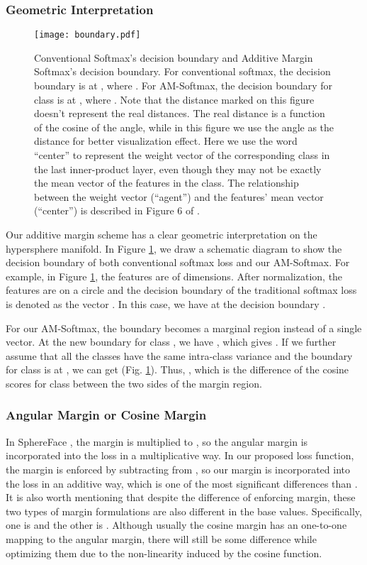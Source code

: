 \documentclass[10pt,twocolumn,letterpaper]{article}
\begin{document}
\subsubsection{Geometric Interpretation}
\begin{figure}
	\centering
	\texttt{[image: boundary.pdf]}
	\caption{ Conventional Softmax's decision boundary and Additive Margin Softmax's decision boundary. For conventional softmax, the decision boundary is at , where . For AM-Softmax, the decision boundary for class  is at , where . Note that the distance marked on this figure doesn't represent the real distances. The real distance is a function of the cosine of the angle, while in this figure we use the angle as the distance for better visualization effect. Here we use the word ``center'' to represent the weight vector of the corresponding class in the last inner-product layer, even though they may not be exactly the mean vector of the features in the class. The relationship between the weight vector (``agent'') and the features' mean vector (``center'') is described in Figure 6 of \cite{wang2017normface}.
	}
	\label{fig:boundary}
\end{figure}
Our additive margin scheme has a clear geometric interpretation on the hypersphere manifold. In Figure \ref{fig:boundary}, we draw a schematic diagram to show the decision boundary of both conventional softmax loss and our AM-Softmax. For example, in Figure \ref{fig:boundary}, the features are of  dimensions. After normalization, the features are on a circle and the decision boundary of the traditional softmax loss is denoted as the vector . In this case, we have  at the decision boundary . 

For our AM-Softmax, the boundary becomes a marginal region instead of a single vector. At the new boundary  for class , we have , which gives . If we further assume that all the classes have the same intra-class variance and the boundary for class  is at , we can get  (Fig. \ref{fig:boundary}). Thus, , which is the difference of the cosine scores for class  between the two sides of the margin region.



\subsubsection{Angular Margin or Cosine Margin}

In SphereFace \cite{liu2017sphereface}, the margin  is multiplied to , so the angular margin is incorporated into the loss in a multiplicative way. In our proposed loss function, the margin is enforced by subtracting  from , so our margin is incorporated into the loss in an additive way, which is one of the most significant differences than \cite{liu2017sphereface}. It is also worth mentioning that despite the difference of enforcing margin, these two types of margin formulations are also different in the base values. Specifically, one is  and the other is . Although usually the cosine margin has an one-to-one mapping to the angular margin, there will still be some difference while optimizing them due to the non-linearity induced by the cosine function.
\end{document}
